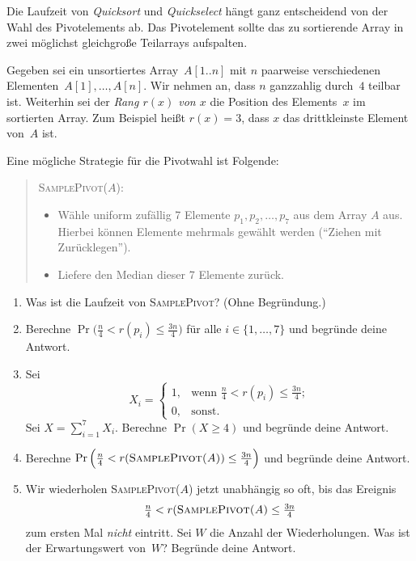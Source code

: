 \documentclass{uebung_cs}
\begin{document}
\begin{aufgabe}
	Die Laufzeit von \textit{Quicksort} und \textit{Quickselect} hängt ganz entscheidend von der Wahl des Pivotelements ab.
	Das Pivotelement sollte das zu sortierende Array in zwei möglichst gleichgroße Teilarrays aufspalten.

	Gegeben sei ein unsortiertes Array~$A[1..n]$ mit $n$ paarweise verschiedenen Elementen~$A[1], \dots, A[n]$. Wir nehmen an, dass $n$ ganzzahlig durch~$4$ teilbar ist.
	Weiterhin sei der \emph{Rang $r(x)$ von $x$} die Position des Elements~$x$ im sortierten Array. Zum Beispiel heißt $r(x)=3$, dass $x$ das drittkleinste Element von~$A$ ist.

	Eine mögliche Strategie für die Pivotwahl ist Folgende:

	\begin{quote}
		\textsc{SamplePivot($A$):}
		\begin{itemize}
			\item Wähle uniform zufällig 7 Elemente $p_1,p_2,\dots,p_7$ aus dem Array $A$ aus. Hierbei können Elemente mehrmals gewählt werden (\enquote{Ziehen mit Zurücklegen}).
			\item Liefere den Median dieser 7 Elemente zurück.
		\end{itemize}
	\end{quote}
	\begin{enumerate}
		\item Was ist die Laufzeit von \textsc{SamplePivot}? (Ohne Begründung.)
		\item Berechne $\Pr\Big(\frac{n}{4}<r(p_i)\le\frac{3n}{4}\Big)$ für alle $i\in\{1,\dots,7\}$ und begründe deine Antwort.
		\item Sei
		\[X_i=
		\begin{cases}
			1,&\text{wenn }
			\frac{n}{4}<r(p_i)\le\frac{3n}{4};\\
			0,&\text{sonst.}
		\end{cases}
		\]
		Sei $X=\sum_{i=1}^7 X_i$.
		Berechne $\Pr\left(X\ge 4\right)$ und begründe deine Antwort.
		\item Berechne $\Pr\Big(\frac{n}{4}<r(\text{\textsc{SamplePivot($A$)}})\le\frac{3n}{4}\Big)$ und begründe deine Antwort.
		\item Wir wiederholen \textsc{SamplePivot($A$)} jetzt unabhängig so oft, bis das Ereignis \[\tfrac{n}{4}<r(\text{\textsc{SamplePivot($A$)}}\le\tfrac{3n}{4}\] zum ersten Mal \emph{nicht} eintritt. Sei $W$ die Anzahl der Wiederholungen. Was ist der Erwartungswert von~$W$? Begründe deine Antwort.
	\end{enumerate}
\end{aufgabe}
\end{document}
